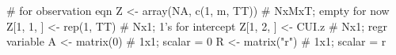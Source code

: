 \begin{Schunk}
\begin{Sinput}
 # for observation eqn
 Z <- array(NA, c(1, m, TT)) # NxMxT; empty for now
 Z[1, 1, ] <- rep(1, TT) # Nx1; 1's for intercept
 Z[1, 2, ] <- CUI.z # Nx1; regr variable
 A <- matrix(0) # 1x1; scalar = 0
 R <- matrix("r") # 1x1; scalar = r
\end{Sinput}
\end{Schunk}
